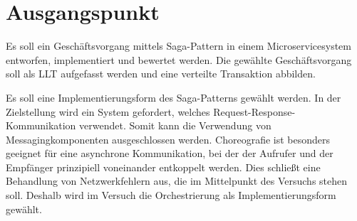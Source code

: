 \section{Ausgangspunkt}

Es soll ein Geschäftsvorgang mittels Saga-Pattern in einem Microservicesystem entworfen, implementiert und bewertet werden. Die gewählte Geschäftsvorgang soll als LLT aufgefasst werden und eine verteilte Transaktion abbilden. 

Es soll eine Implementierungsform des Saga-Patterns gewählt werden. In der Zielstellung wird ein System gefordert, welches Request-Response-Kommunikation verwendet. Somit kann die Verwendung von Messagingkomponenten ausgeschlossen werden. Choreografie ist besonders geeignet für eine asynchrone Kommunikation, bei der der Aufrufer und der Empfänger prinzipiell voneinander entkoppelt werden. Dies schließt eine Behandlung von Netzwerkfehlern aus, die im Mittelpunkt des Versuchs stehen soll. Deshalb wird im Versuch die Orchestrierung als Implementierungsform gewählt.